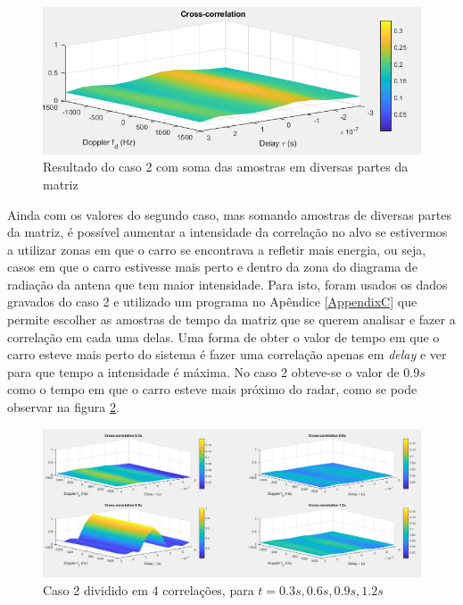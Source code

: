 \begin{figure}[h]
\centering
\includegraphics[scale=0.5]{chapters/ch5/assets/15mmsum}
\caption[Caso 2 especial]{Resultado do caso 2 com soma das amostras em diversas partes da matriz}
\label{fig:15mmsum}
\end{figure}

Ainda com os valores do segundo caso, mas somando amostras de diversas partes da matriz, é possível aumentar a intensidade da correlação no alvo se estivermos a utilizar zonas em que o carro se encontrava a refletir mais energia, ou seja, casos em que o carro estivesse mais perto e dentro da zona do diagrama de radiação da antena que tem maior intensidade. Para isto, foram usados os dados gravados do caso 2 e utilizado um programa no Apêndice \ref{AppendixC} que permite escolher as amostras de tempo da matriz que se querem analisar e fazer a correlação em cada uma delas. Uma forma de obter o valor de tempo em que o carro esteve mais perto do sistema é fazer uma correlação apenas em \textit{delay} e ver para que tempo a intensidade é máxima. No caso 2 obteve-se o valor de $0.9 s$ como o tempo em que o carro esteve mais próximo do radar, como se pode observar na figura \ref{fig:4ca}.

\begin{figure}[h]
\centering
\includegraphics[scale=0.35]{chapters/ch5/assets/4ca}
\caption[Caso 2 dividido em 4 correlações]{Caso 2 dividido em 4 correlações, para $t=0.3s, 0.6s, 0.9s, 1.2s$}
\label{fig:4ca}
\end{figure}
